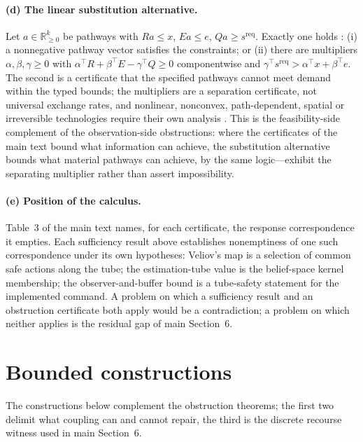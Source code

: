 \documentclass[11pt,a4paper]{article}
\theoremstyle{plain}
\theoremstyle{definition}
\theoremstyle{remark}
\newcommand{\R}{\mathbb{R}}
\begin{document}
\paragraph{(d) The linear substitution alternative.} Let $a\in\R^k_{\ge0}$ be pathways with $Ra\le x$, $Ea\le e$, $Qa\ge s^{\mathrm{req}}$. Exactly one holds \citep{farkas1902,gale1960}: (i) a nonnegative pathway vector satisfies the constraints; or (ii) there are multipliers $\alpha,\beta,\gamma\ge0$ with $\alpha^\top R+\beta^\top E-\gamma^\top Q\ge0$ componentwise and $\gamma^\top s^{\mathrm{req}}>\alpha^\top x+\beta^\top e$. The second is a certificate that the specified pathways cannot meet demand within the typed bounds; the multipliers are a separation certificate, not universal exchange rates, and nonlinear, nonconvex, path-dependent, spatial or irreversible technologies require their own analysis \citep{abaee2026aggregate}. This is the feasibility-side complement of the observation-side obstructions: where the certificates of the main text bound what information can achieve, the substitution alternative bounds what material pathways can achieve, by the same logic---exhibit the separating multiplier rather than assert impossibility.

\paragraph{(e) Position of the calculus.} Table~3 of the main text names, for each certificate, the response correspondence it empties. Each sufficiency result above establishes nonemptiness of one such correspondence under its own hypotheses: Veliov's map is a selection of common safe actions along the tube; the estimation-tube value is the belief-space kernel membership; the observer-and-buffer bound is a tube-safety statement for the implemented command. A problem on which a sufficiency result and an obstruction certificate both apply would be a contradiction; a problem on which neither applies is the residual gap of main Section~6.
\section{Bounded constructions}\label{S:constructions}

The constructions below complement the obstruction theorems; the first two delimit what coupling can and cannot repair, the third is the discrete recourse witness used in main Section~6.
\end{document}
